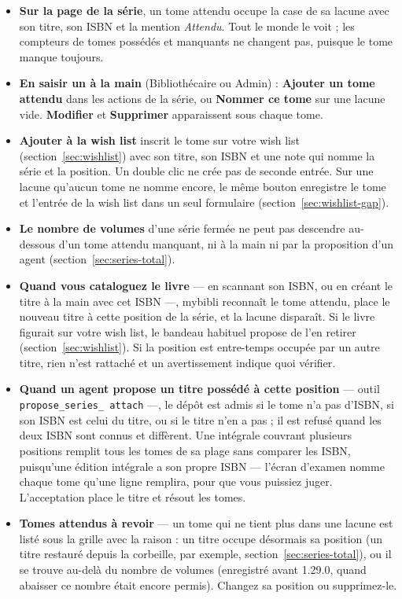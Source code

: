 \begin{itemize}
  \item \textbf{Sur la page de la série}, un tome attendu occupe la
        case de sa lacune avec son titre, son ISBN et la mention
        \emph{Attendu}. Tout le monde le voit ; les compteurs de
        tomes possédés et manquants ne changent pas, puisque le tome
        manque toujours.
  \item \textbf{En saisir un à la main} (Bibliothécaire ou Admin) :
        \textbf{Ajouter un tome attendu} dans les actions de la
        série, ou \textbf{Nommer ce tome} sur une lacune vide.
        \textbf{Modifier} et \textbf{Supprimer} apparaissent sous
        chaque tome.
  \item \textbf{Ajouter à la wish list} inscrit le tome sur votre
        wish list (section~\ref{sec:wishlist}) avec son titre, son
        ISBN et une note qui nomme la série et la position. Un double
        clic ne crée pas de seconde entrée. Sur une lacune qu'aucun
        tome ne nomme encore, le même bouton enregistre le tome et
        l'entrée de la wish list dans un seul formulaire
        (section~\ref{sec:wishlist-gap}).
  \item \textbf{Le nombre de volumes} d'une série fermée ne peut pas
        descendre au-dessous d'un tome attendu manquant, ni à la main
        ni par la proposition d'un agent
        (section~\ref{sec:series-total}).
  \item \textbf{Quand vous cataloguez le livre} --- en scannant son
        ISBN, ou en créant le titre à la main avec cet ISBN ---,
        mybibli reconnaît le tome attendu, place le nouveau titre à
        cette position de la série, et la lacune disparaît. Si le
        livre figurait sur votre wish list, le bandeau habituel
        propose de l'en retirer (section~\ref{sec:wishlist}). Si la
        position est entre-temps occupée par un autre titre, rien
        n'est rattaché et un avertissement indique quoi vérifier.
  \item \textbf{Quand un agent propose un titre possédé à cette
        position} --- outil \texttt{propose\_series\_\allowbreak
        attach} ---, le dépôt est admis si le tome n'a pas d'ISBN, si son ISBN est
        celui du titre, ou si le titre n'en a pas ; il est refusé quand
        les deux ISBN sont connus et diffèrent. Une
        intégrale couvrant plusieurs positions remplit tous les tomes de
        sa plage sans comparer les ISBN, puisqu'une édition intégrale a
        son propre ISBN --- l'écran d'examen nomme chaque tome qu'une
        ligne remplira, pour que vous puissiez juger. L'acceptation
        place le titre et résout les tomes.
  \item \textbf{Tomes attendus à revoir} --- un tome qui ne tient plus
        dans une lacune est listé sous la grille avec la raison : un
        titre occupe désormais sa position (un titre restauré depuis la
        corbeille, par exemple, section~\ref{sec:series-total}), ou il
        se trouve au-delà du nombre de volumes (enregistré avant 1.29.0,
        quand abaisser ce nombre était encore permis). Changez sa
        position ou supprimez-le.
\end{itemize}

